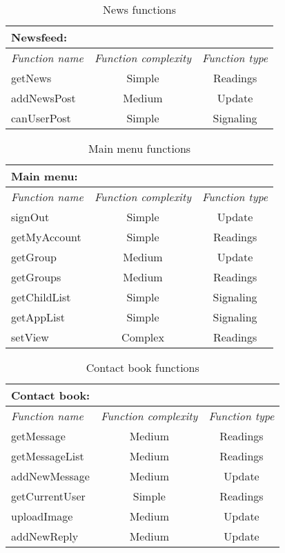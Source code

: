\begin{table}[!ht]
\centering
\begin{tabular}{ l  c  c }

Newsfeed: & & \\ \hline
\textit{Function name} & \textit{Function complexity} & \textit{Function type} \\ \hline
getNews & Simple & Readings \\ \hline
addNewsPost & Medium & Update \\ \hline
canUserPost & Simple & Signaling \\ \hline

\end{tabular}
\caption{News functions}
\label{tbl:newsfeed}
\end{table}

\begin{table}[!ht]
\centering
\begin{tabular}{ l  c  c }

Main menu: & & \\ \hline
\textit{Function name} & \textit{Function complexity} & \textit{Function type} \\ \hline
signOut & Simple & Update \\ \hline
getMyAccount & Simple & Readings \\ \hline
getGroup & Medium & Update \\ \hline
getGroups & Medium & Readings \\ \hline
getChildList & Simple & Signaling \\ \hline
getAppList & Simple & Signaling \\ \hline
setView & Complex & Readings \\ \hline

\end{tabular}
\caption{Main menu functions}
\label{tbl:mainmenu}
\end{table}

\begin{table}[!ht]
\centering
\begin{tabular}{ l  c  c }

Contact book: & & \\ \hline
\textit{Function name} & \textit{Function complexity} & \textit{Function type} \\ \hline
getMessage & Medium & Readings \\ \hline
getMessageList & Medium & Readings \\ \hline
addNewMessage & Medium & Update \\ \hline
getCurrentUser & Simple & Readings \\ \hline
uploadImage & Medium & Update \\ \hline
addNewReply & Medium & Update \\ \hline

\end{tabular}
\caption{Contact book functions}
\label{tbl:contactbook}
\end{table}

